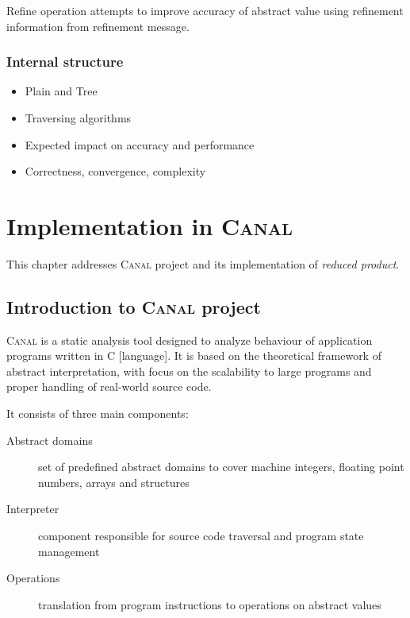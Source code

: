 \documentclass[12pt,oneside]{fithesis2}
\theoremstyle{definition}
\begin{document}
Refine operation attempts to improve accuracy of abstract value using refinement information from refinement message.

\subsection{Internal structure}
\begin{itemize}
  \item Plain and Tree
  \item Traversing algorithms
  \item Expected impact on accuracy and performance
  \item Correctness, convergence, complexity
\end{itemize}


\chapter{Implementation in \textsc{Canal}}

This chapter addresses \textsc{Canal} project and its implementation of \textit{reduced product}.

\section{Introduction to \textsc{Canal} project}

\textsc{Canal} is a static analysis tool designed to analyze behaviour of
application programs written in C [language]. It is based on the theoretical
framework of abstract interpretation, with focus on the scalability to
large programs and proper handling of real-world source code. \cite{Canal}

It consists of three main components:

\begin{description}
  \item[Abstract domains] set of predefined abstract domains to cover machine integers, floating point numbers, arrays and structures
  \item[Interpreter] component responsible for source code traversal and program state management
  \item[Operations] translation from program instructions to operations on abstract values
\end{description}
\end{document}

